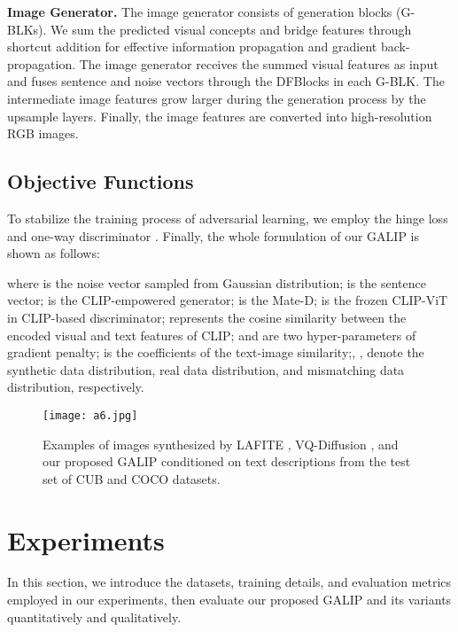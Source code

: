 \documentclass[10pt,twocolumn,letterpaper]{article}
\begin{document}
\noindent \textbf{Image Generator.} The image generator consists of  generation blocks (G-BLKs).
We sum the predicted visual concepts and bridge features through shortcut addition for effective information propagation and gradient back-propagation.
The image generator receives the summed visual features as input and fuses sentence and noise vectors through the DFBlocks \cite{tao2020df} in each G-BLK.
The intermediate image features grow larger during the generation process by the upsample layers.
Finally, the image features are converted into high-resolution RGB images.

\subsection{Objective Functions}

To stabilize the training process of adversarial learning, we employ the hinge loss \cite{zhang2019self} and one-way discriminator \cite{tao2020df}.
Finally, the whole formulation of our GALIP is shown as follows:

\begin{small} 

\end{small}
where  is the noise vector sampled from Gaussian distribution;  is the sentence vector;  is the CLIP-empowered generator;  is the Mate-D;  is the frozen CLIP-ViT in CLIP-based discriminator;  represents the cosine similarity between the encoded visual and text features of CLIP;  and  are two hyper-parameters of gradient penalty;  is the coefficients of the text-image similarity;, ,  denote the synthetic data distribution, real data distribution, and mismatching data distribution, respectively.


\begin{figure*}[t] \small
  \centering
  \texttt{[image: a6.jpg]}
  \caption{Examples of images synthesized by LAFITE \cite{zhou2022towards}, VQ-Diffusion \cite{gu2022vector}, and our proposed GALIP conditioned on text descriptions from the test set of CUB and COCO datasets.}
  \label{fig5}
  \vspace{-0.4cm}
\end{figure*}


\section{Experiments}

In this section, we introduce the datasets, training details, and evaluation metrics employed in our experiments, then evaluate our proposed GALIP and its variants quantitatively and qualitatively. 
\end{document}
